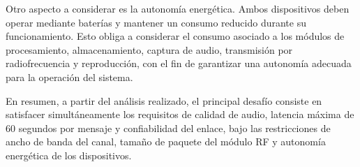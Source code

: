 Otro aspecto a considerar es la autonomía energética.
Ambos dispositivos deben operar mediante baterías y mantener un consumo reducido durante su funcionamiento.
Esto obliga a considerar el consumo asociado a los módulos de procesamiento, almacenamiento, captura de audio, transmisión por radiofrecuencia y reproducción, con el fin de garantizar una autonomía adecuada para la operación del sistema.

En resumen, a partir del análisis realizado, el principal desafío consiste en satisfacer simultáneamente los requisitos de calidad de audio, latencia máxima de $60$ segundos por mensaje y confiabilidad del enlace, bajo las restricciones de ancho de banda del canal, tamaño de paquete del módulo RF y autonomía energética de los dispositivos.